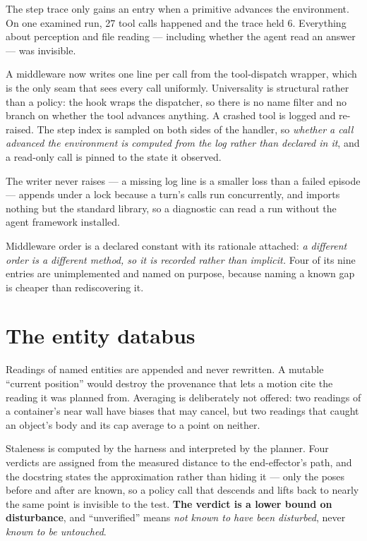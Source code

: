\documentclass[11pt,a4paper]{report}
\begin{document}
The step trace only gains an entry when a primitive advances the environment. On
one examined run, 27 tool calls happened and the trace held 6. Everything about
perception and file reading --- including whether the agent read an answer ---
was invisible.

A middleware now writes one line per call from the tool-dispatch wrapper, which
is the only seam that sees every call uniformly. Universality is structural
rather than a policy: the hook wraps the dispatcher, so there is no name filter
and no branch on whether the tool advances anything. A crashed tool is logged
and re-raised. The step index is sampled on both sides of the handler, so
\emph{whether a call advanced the environment is computed from the log rather
than declared in it}, and a read-only call is pinned to the state it observed.

The writer never raises --- a missing log line is a smaller loss than a failed
episode --- appends under a lock because a turn's calls run concurrently, and
imports nothing but the standard library, so a diagnostic can read a run without
the agent framework installed.

Middleware order is a declared constant with its rationale attached: \emph{a
different order is a different method, so it is recorded rather than implicit.}
Four of its nine entries are unimplemented and named on purpose, because naming
a known gap is cheaper than rediscovering it.

\section{The entity databus}

Readings of named entities are appended and never rewritten. A mutable ``current
position'' would destroy the provenance that lets a motion cite the reading it
was planned from. Averaging is deliberately not offered: two readings of a
container's near wall have biases that may cancel, but two readings that caught
an object's body and its cap average to a point on neither.

Staleness is computed by the harness and interpreted by the planner. Four
verdicts are assigned from the measured distance to the end-effector's path, and
the docstring states the approximation rather than hiding it --- only the poses
before and after are known, so a policy call that descends and lifts back to
nearly the same point is invisible to the test. \textbf{The verdict is a lower
bound on disturbance}, and ``unverified'' means \emph{not known to have been
disturbed}, never \emph{known to be untouched}.
\end{document}
